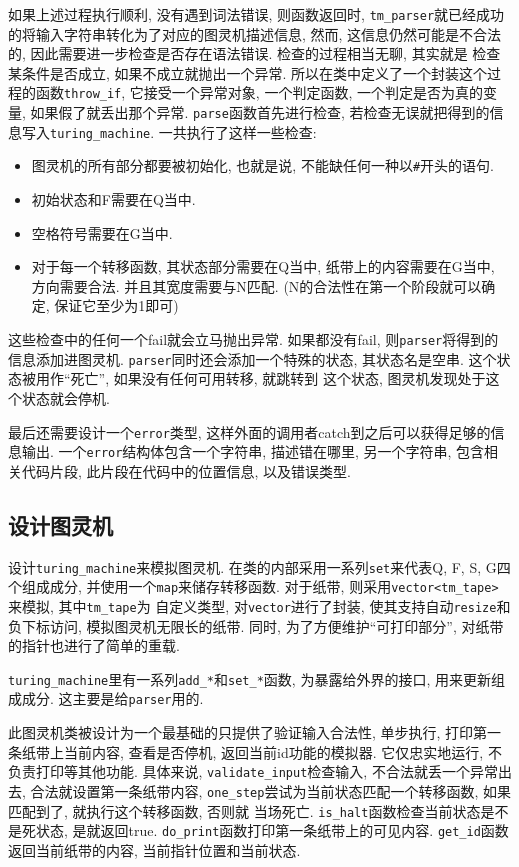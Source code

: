 \documentclass[utf8]{article}
\begin{document}
如果上述过程执行顺利, 没有遇到词法错误, 则函数返回时, \verb|tm_parser|就已经成功的将输入字符串转化为了对应的图灵机描述信息, 然而, 这信息仍然可能是不合法的, 因此需要进一步检查是否存在语法错误. 检查的过程相当无聊, 其实就是
检查某条件是否成立, 如果不成立就抛出一个异常. 所以在类中定义了一个封装这个过程的函数\verb|throw_if|, 它接受一个异常对象, 一个判定函数, 一个判定是否为真的变量, 如果假了就丢出那个异常. \verb|parse|函数首先进行检查, 
若检查无误就把得到的信息写入\verb|turing_machine|. 一共执行了这样一些检查:
\begin{itemize}
  \item 图灵机的所有部分都要被初始化, 也就是说, 不能缺任何一种以\verb|#|开头的语句. 
  \item 初始状态和F需要在Q当中.
  \item 空格符号需要在G当中.
  \item 对于每一个转移函数, 其状态部分需要在Q当中, 纸带上的内容需要在G当中, 方向需要合法. 并且其宽度需要与N匹配. (N的合法性在第一个阶段就可以确定, 保证它至少为1即可)
\end{itemize}
这些检查中的任何一个fail就会立马抛出异常. 如果都没有fail, 则\verb|parser|将得到的信息添加进图灵机. \verb|parser|同时还会添加一个特殊的状态, 其状态名是空串. 这个状态被用作``死亡'', 如果没有任何可用转移, 就跳转到
这个状态, 图灵机发现处于这个状态就会停机. 

最后还需要设计一个\verb|error|类型, 这样外面的调用者catch到之后可以获得足够的信息输出. 一个\verb|error|结构体包含一个字符串, 描述错在哪里, 另一个字符串, 包含相关代码片段, 此片段在代码中的位置信息, 以及错误类型. 
\subsection[图灵机]{设计图灵机}
设计\verb|turing_machine|来模拟图灵机. 在类的内部采用一系列\verb|set|来代表Q, F, S, G四个组成成分, 并使用一个\verb|map|来储存转移函数. 对于纸带, 则采用\verb|vector<tm_tape>|来模拟, 其中\verb|tm_tape|为
自定义类型, 对\verb|vector|进行了封装, 使其支持自动\verb|resize|和负下标访问, 模拟图灵机无限长的纸带. 同时, 为了方便维护``可打印部分'', 对纸带的指针也进行了简单的重载. 

\verb|turing_machine|里有一系列\verb|add_*|和\verb|set_*|函数, 为暴露给外界的接口, 用来更新组成成分. 这主要是给\verb|parser|用的.

此图灵机类被设计为一个最基础的只提供了验证输入合法性, 单步执行, 打印第一条纸带上当前内容, 查看是否停机, 返回当前id功能的模拟器. 它仅忠实地运行, 不负责打印等其他功能. 
具体来说, \verb|validate_input|检查输入, 不合法就丢一个异常出去, 合法就设置第一条纸带内容, \verb|one_step|尝试为当前状态匹配一个转移函数, 如果匹配到了, 就执行这个转移函数, 否则就
当场死亡. \verb|is_halt|函数检查当前状态是不是死状态, 是就返回true. \verb|do_print|函数打印第一条纸带上的可见内容. \verb|get_id|函数返回当前纸带的内容, 当前指针位置和当前状态. 
\end{document}
